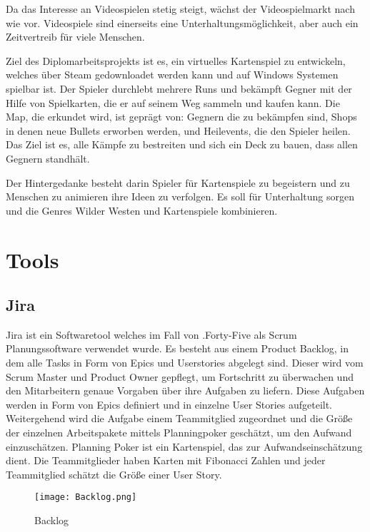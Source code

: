 
%
Da das Interesse an Videospielen stetig steigt, wächst der Videospielmarkt nach wie vor. Videospiele sind einerseits eine Unterhaltungsmöglichkeit, aber auch ein Zeitvertreib für viele Menschen.

Ziel des Diplomarbeitsprojekts ist es, ein virtuelles Kartenspiel zu entwickeln, welches über Steam gedownloadet werden kann und auf Windows Systemen spielbar ist. Der Spieler durchlebt mehrere Runs und bekämpft Gegner mit der Hilfe von Spielkarten, die er auf seinem Weg sammeln und kaufen kann. Die Map, die erkundet wird, ist geprägt von: Gegnern die zu bekämpfen sind, Shops in denen neue Bullets erworben werden, und Heilevents, die den Spieler heilen. Das Ziel ist es, alle Kämpfe zu bestreiten und sich ein Deck zu bauen, dass allen Gegnern standhält.

Der Hintergedanke besteht darin Spieler für Kartenspiele zu begeistern und zu Menschen zu animieren ihre Ideen zu verfolgen. Es soll für Unterhaltung sorgen und die Genres Wilder Westen und Kartenspiele kombinieren.
%


\section{Tools}\label{sec:tools}

\renewcommand{\kapitelautor}{Autor: Irgendwer} %

\subsection{Jira}\label{subsec:jira}
%
Jira ist ein Softwaretool welches im Fall von .Forty-Five als Scrum Planungssoftware verwendet wurde.
Es besteht aus einem Product Backlog, in dem alle Tasks in Form von Epics und Userstories abgelegt sind.
Dieser wird vom Scrum Master und Product Owner gepflegt, um Fortschritt zu überwachen und den Mitarbeitern genaue Vorgaben über ihre Aufgaben zu liefern.
Diese Aufgaben werden in Form von Epics definiert und in einzelne User Stories aufgeteilt.
Weitergehend wird die Aufgabe einem Teammitglied zugeordnet und die Größe der einzelnen Arbeitspakete mittels Planningpoker geschätzt, um den Aufwand einzuschätzen.
Planning Poker ist ein Kartenspiel, das zur Aufwandseinschätzung dient. Die Teammitglieder haben Karten mit Fibonacci Zahlen und jeder Teammitglied schätzt die Größe einer User Story.

\begin{figure}[H]
    \texttt{[image: Backlog.png]}
    \caption{Backlog}
\end{figure}

